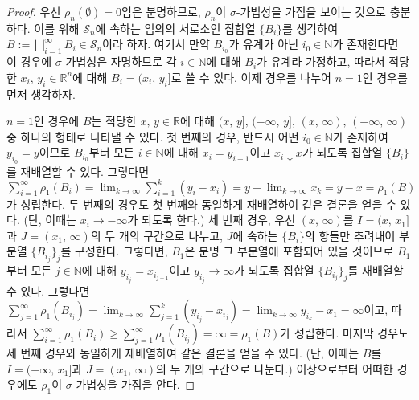 \begin{proof}
    우선 $\rho_n(\emptyset)=0$임은 분명하므로, $\rho_n$이 $\sigma$-가법성을 가짐을 보이는 것으로 충분하다. 이를 위해 $\mathcal{S}_n$에 속하는 임의의 서로소인 집합열 $\{B_i\}$를 생각하여 $B:=\bigsqcup_{i=1}^\infty B_i\in\mathcal{S}_n$이라 하자. 여기서 만약 $B_{i_0}$가 유계가 아닌 $i_0\in\mathbb{N}$가 존재한다면 이 경우에 $\sigma$-가법성은 자명하므로 각 $i\in\mathbb{N}$에 대해 $B_i$가 유계라 가정하고, 따라서 적당한 $x_i,\,y_i\in\mathbb{R}^n$에 대해 $B_i=(x_i,\,y_i]$로 쓸 수 있다. 이제 경우를 나누어 $n=1$인 경우를 먼저 생각하자.

    $n=1$인 경우에 $B$는 적당한 $x,\,y\in\mathbb{R}$에 대해 $(x,\,y],\,(-\infty,\,y],\,(x,\,\infty),\,(-\infty,\,\infty)$ 중 하나의 형태로 나타낼 수 있다. 첫 번째의 경우, 반드시 어떤 $i_0\in\mathbb{N}$가 존재하여 $y_{i_0}=y$이므로 $B_{i_0}$부터 모든 $i\in\mathbb{N}$에 대해 $x_i=y_{i+1}$이고 $x_i\downarrow x$가 되도록 집합열 $\{B_i\}$를  재배열할 수 있다. 그렇다면 $\sum_{i=1}^\infty\rho_1(B_i)=\lim_{k\to\infty}\sum_{i=1}^k(y_i-x_i)=y-\lim_{k\to\infty}x_k=y-x=\rho_1(B)$가 성립한다. 두 번째의 경우도 첫 번째와 동일하게 재배열하여 같은 결론을 얻을 수 있다. (단, 이때는 $x_i\to-\infty$가 되도록 한다.) 세 번째 경우, 우선 $(x,\,\infty)$를 $I=(x,\,x_1]$과 $J=(x_1,\,\infty)$의 두 개의 구간으로 나누고, $J$에 속하는 $\{B_i\}$의 항들만 추려내어 부분열 $\{B_{i_j}\}_j$를 구성한다. 그렇다면, $B_1$은 분명 그 부분열에 포함되어 있을 것이므로 $B_1$부터 모든 $j\in\mathbb{N}$에 대해 $y_{i_j}=x_{i_{j+1}}$이고 $y_{i_j}\to\infty$가 되도록 집합열 $\{B_{i_j}\}_j$를 재배열할 수 있다. 그렇다면 $\sum_{j=1}^\infty\rho_1(B_{i_j})=\lim_{k\to\infty}\sum_{j=1}^k(y_{i_j}-x_{i_j})=\lim_{k\to\infty}y_{i_k}-x_1=\infty$이고, 따라서 $\sum_{i=1}^\infty\rho_1(B_i)\geq\sum_{j=1}^\infty\rho_1(B_{i_j})=\infty=\rho_1(B)$가 성립한다. 마지막 경우도 세 번째 경우와 동일하게 재배열하여 같은 결론을 얻을 수 있다. (단, 이때는 $B$를 $I=(-\infty,\,x_1]$과 $J=(x_1,\,\infty)$의 두 개의 구간으로 나눈다.) 이상으로부터 어떠한 경우에도 $\rho_1$이 $\sigma$-가법성을 가짐을 안다.


\end{proof}
